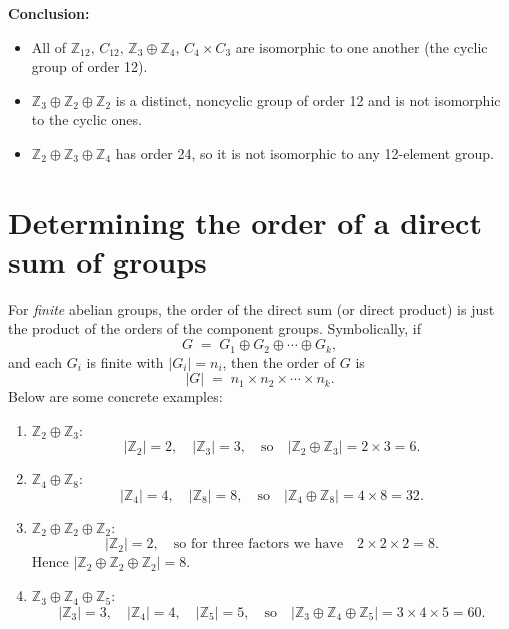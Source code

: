 \documentclass[12pt]{article}
\theoremstyle{definition} %
\theoremstyle{plain} %
\begin{document}
\noindent \textbf{Conclusion:}
\begin{itemize}
    \item All of 
      \(\mathbb{Z}_{12},\, C_{12},\, \mathbb{Z}_{3}\oplus \mathbb{Z}_{4},\, C_{4}\times C_{3}\)
      are isomorphic to one another (the cyclic group of order 12).
    \item \(\mathbb{Z}_{3}\oplus \mathbb{Z}_{2}\oplus \mathbb{Z}_{2}\) is a distinct, 
      noncyclic group of order 12 and is not isomorphic to the cyclic ones.
    \item \(\mathbb{Z}_{2}\oplus \mathbb{Z}_{3}\oplus \mathbb{Z}_{4}\) has order 24, so it 
      is not isomorphic to any 12-element group.
\end{itemize}

\section*{Determining the order of a direct sum of groups}

For \emph{finite} abelian groups, the order of the direct sum (or direct product) is just the product of the orders of the component groups. Symbolically, if
\[
  G \;=\; G_1 \oplus G_2 \oplus \cdots \oplus G_k,
\]
and each \(G_i\) is finite with \(\lvert G_i \rvert = n_i\), then the order of \(G\) is
\[
  \lvert G \rvert 
  \;=\; 
  n_1 \times n_2 \times \cdots \times n_k.
\]
Below are some concrete examples:

\begin{enumerate}
  \item \(\mathbb{Z}_2 \oplus \mathbb{Z}_3\):
  \[
    \lvert \mathbb{Z}_2 \rvert = 2, 
    \quad 
    \lvert \mathbb{Z}_3 \rvert = 3, 
    \quad 
    \text{so} 
    \quad 
    \lvert \mathbb{Z}_2 \oplus \mathbb{Z}_3 \rvert = 2 \times 3 = 6.
  \]

  \item \(\mathbb{Z}_4 \oplus \mathbb{Z}_8\):
  \[
    \lvert \mathbb{Z}_4 \rvert = 4,
    \quad
    \lvert \mathbb{Z}_8 \rvert = 8,
    \quad
    \text{so}
    \quad
    \lvert \mathbb{Z}_4 \oplus \mathbb{Z}_8 \rvert = 4 \times 8 = 32.
  \]

  \item \(\mathbb{Z}_2 \oplus \mathbb{Z}_2 \oplus \mathbb{Z}_2\):
  \[
    \lvert \mathbb{Z}_2 \rvert = 2,
    \quad
    \text{so for three factors we have}
    \quad
    2 \times 2 \times 2 = 8.
  \]
  Hence \(\lvert \mathbb{Z}_2 \oplus \mathbb{Z}_2 \oplus \mathbb{Z}_2 \rvert = 8.\)

  \item \(\mathbb{Z}_3 \oplus \mathbb{Z}_4 \oplus \mathbb{Z}_5\):
  \[
    \lvert \mathbb{Z}_3 \rvert = 3, 
    \quad
    \lvert \mathbb{Z}_4 \rvert = 4,
    \quad
    \lvert \mathbb{Z}_5 \rvert = 5,
    \quad
    \text{so}
    \quad
    \lvert \mathbb{Z}_3 \oplus \mathbb{Z}_4 \oplus \mathbb{Z}_5 \rvert
    = 3 \times 4 \times 5 
    = 60.
  \]

\end{enumerate}
\end{document}
